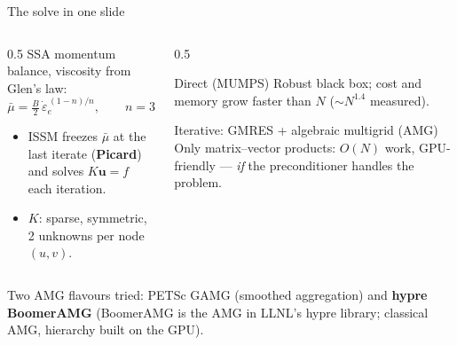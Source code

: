 \documentclass[10pt,aspectratio=169]{beamer}
\newcommand{\uvec}{\mathbf{u}}
\begin{document}
\begin{frame}{The solve in one slide}
  \begin{columns}[T]
    \begin{column}{0.5\textwidth}
      SSA momentum balance, viscosity from Glen's law:
      \[
        \bar\mu = \tfrac{B}{2}\,\dot\varepsilon_e^{\,(1-n)/n},\qquad n=3
      \]
      \begin{itemize}
        \item ISSM freezes $\bar\mu$ at the last iterate (\textbf{Picard}) and
              solves $K\uvec=f$ each iteration.
        \item $K$: sparse, symmetric, \alert{2 unknowns per node} $(u,v)$.
      \end{itemize}
    \end{column}
    \begin{column}{0.5\textwidth}
      \begin{block}{Direct (MUMPS)}
        Robust black box; cost and memory grow faster than $N$
        ($\sim N^{1.4}$ measured).
      \end{block}
      \begin{block}{Iterative: GMRES + algebraic multigrid (AMG)}
        Only matrix--vector products: $O(N)$ work, GPU-friendly ---
        \emph{if} the preconditioner handles the problem.
      \end{block}
    \end{column}
  \end{columns}
  \vspace{0.4em}
  {\small Two AMG flavours tried: PETSc GAMG (smoothed aggregation) and
  \textbf{hypre BoomerAMG} (BoomerAMG is the AMG in LLNL's hypre library; classical AMG,
  hierarchy built on the GPU).}
\end{frame}
\end{document}
